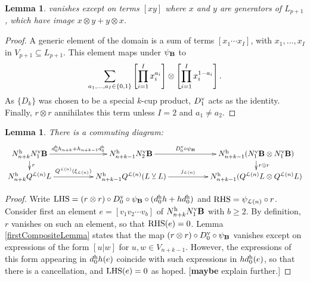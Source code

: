\documentclass[11pt]{amsart}
\theoremstyle{plain}
\newtheorem{lem}[thm]{Lemma}
\theoremstyle{definition}
\newcommand{\calL}{\mathcal{L}}
\theoremstyle{plain}
\newcommand{\smashcoprod}{\veebar}%
\begin{document}
\begin{appendices}
\begin{lem}
vanishes except on terms $[xy]$ where $x$ and $y$ are generators of $ L_{p+1}$, which have image $x\otimes y+y\otimes x$.
\end{lem}
\begin{proof}
A generic element of the domain is a sum of terms $[x_1\cdots x_I]$, with $x_1,\ldots,x_I$ in $V_{p+1}\subseteq L_{p+1}$. This element maps under $\psi_{\textup{\textbf{B}}}$ to
\[\sum_{\smash{a_1,\ldots,a_I\in\{0,1\}}}
\left[\prod_{i=1}^Ix_i^{a_i}\right]\otimes
\left[\prod_{i=1}^Ix_i^{1-a_i}\right].\]
As $\{D_k\}$ was chosen to be a special $k$-cup product, $D_1^\textup{v}$ acts as the identity.
Finally, $r\otimes r$ annihilates this term unless $I=2$ and $a_1\neq a_2$.
\end{proof}
\begin{lem}\label{commuting rectangle lemma for lie operations}
There is a commuting diagram:
\[\xymatrix@R=4mm@C=18mm{
N_{n+k}^\textup{h}N_1^\textup{v}\textup{\textbf{B}} \ar[r]^-{d^\textup{h}_0h_{n+k}+h_{n+k-1}d^\textup{h}_0}
\ar[d]^-{r}&%
N_{n+k-1}^\textup{h}N_2^\textup{v}\textup{\textbf{B}} \ar[r]^-{D^\textup{v}_0\circ\psi_{\textup{\textbf{B}}}}&%
N_{n+k-1}^\textup{h}(N_1^\textup{v}\textup{\textbf{B}}\otimes N_1^\textup{v}\textup{\textbf{B}})\ar[d]^-{r\otimes r}
\\%
N_{n+k}^\textup{h}Q^{\calL(n)} L  \ar[r]^-{Q^{\calL(n)}(\xi_{\calL(n)})}&%
N_{n+k-1}^\textup{h}Q^{\calL(n)}( L\smashcoprod  L) \ar[r]^-{j_{\calL(n)}}&%
N_{n+k-1}^\textup{h}(Q^{\calL(n)} L \otimes Q^{\calL(n)} L )
}\]
\end{lem}
\begin{proof}
Write
$\textup{LHS}=(r\otimes r)\circ D^\textup{v}_0\circ\psi_{\textup{\textbf{B}}}\circ(d_0^\textup{h}h+hd^\textup{h}_0)$ and $\textup{RHS}= \psi_{\calL(n)}\circ r$.
Consider first an element $e=[v_1v_2\cdots v_b]$ of $N_{n+k}^\textup{h}N_1^\textup{v}\textbf{B}$ with $b\geq2$. By definition, $r$ vanishes on such an element, so that $\textup{RHS}(e)=0$. Lemma \ref{firstCompositeLemma} states that the map $(r\otimes r)\circ D^\textup{v}_0\circ\psi_{\textup{\textbf{B}}}$ vanishes except on expressions of the form $[u|w]$ for $u,w\in V_{n+k-1}$. However, the expressions of this form appearing in $d^\textup{h}_0h(e)$ coincide with such expressions in $hd^\textup{h}_0(e)$, so that there is a cancellation, and $\textup{LHS}(e)=0$ as hoped. [\textbf{maybe} explain further.]


\end{proof}
\end{appendices}
\end{document}
